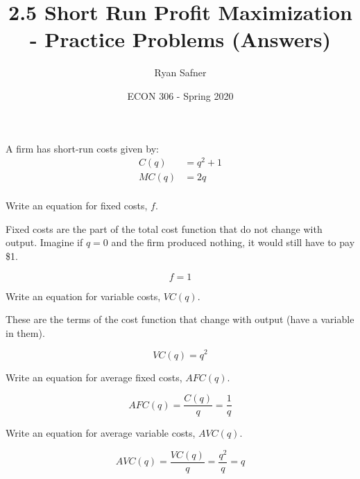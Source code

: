 \documentclass[12 pt]{exam}
\title{2.5 Short Run Profit Maximization - Practice Problems (Answers)}
\author{Ryan Safner}
\date{ECON 306 - Spring 2020}
\begin{document}
\maketitle

A firm has short-run costs given by:
$$\begin{aligned}
C(q)&=q^2+1\\
MC(q)&=2q\\ \end{aligned}$$

\begin{questions}

\question Write an equation for fixed costs, $f$.

\begin{solution}
Fixed costs are the part of the total cost function that do not change with output. Imagine if $q=0$ and the firm produced nothing, it would still have to pay \$1. 

\begin{equation*}
f=1	
\end{equation*}
\end{solution}

\question Write an equation for variable costs, $VC(q)$.

\begin{solution}

These are the terms of the cost function that change with output (have a variable in them). 

\begin{equation*}
VC(q)=q^2 	
\end{equation*}

\end{solution}

\question Write an equation for average fixed costs, $AFC(q)$.

\begin{solution}
\begin{equation*}
AFC(q)=\frac{C(q)}{q}=\frac{1}{q} 	
\end{equation*}

\end{solution}

\question Write an equation for average variable costs, $AVC(q)$.

\begin{solution}

\begin{equation*}
AVC(q)=\frac{VC(q)}{q}=\frac{q^2}{q} = q
\end{equation*}


\end{solution}
\end{questions}
\end{document}

